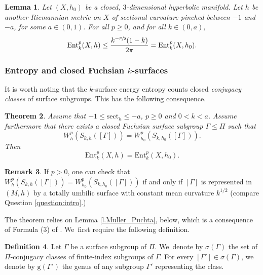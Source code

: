 \documentclass[11pt]{article}
\newcommand{\ksurface}{$k$\nobreakdash-surface\xspace}
\newcommand{\ksurfaces}{$k$\nobreakdash-surfaces\xspace}
\theoremstyle{plain}
\newtheorem{theorem}{Theorem}[section]
\newtheorem{lemma}[theorem]{Lemma}
\theoremstyle{definition}
\newtheorem{defi}[theorem]{Definition}
\newtheorem{remark}[theorem]{Remark}
\newcommand{\sect}{\mathrm{sect}}
\newcommand{\Ent}{\mathrm{Ent}}
\begin{document}
\begin{lemma}\label{l_inequality_entropy}
Let $(X,h_0)$ be a closed, $3$\nobreakdash-dimensional hyperbolic manifold. Let $h$ be another Riemannian metric on $X$ of sectional curvature pinched between $-1$ and $-a$, for some $a\in(0,1)$. For all $p\geq 0$, and for all $k\in(0,a)$,
\begin{equation*}
\Ent^{p}_{k}(X,h)\leq\frac{k^{-\sfrac{p}{2}}(1-k)}{2\pi}=\Ent^{p}_{k}(X,h_0).
\end{equation*}
\end{lemma}

\subsubsection{Entropy and closed Fuchsian \protect\ksurfaces} It is worth noting that the \ksurface energy entropy counts closed \emph{conjugacy classes} of surface subgroups. This has the following consequence.

\begin{theorem}\label{th.totally_umb_implies_big_entropy}
Assume that $-1\leq\sect_h\leq-a$, $p\geq 0$ and $0<k<a$. Assume furthermore that there exists a closed \emph{Fuchsian} surface subgroup $\Gamma\leq\Pi$ such that
\begin{equation*}
W^{p}_{h}(S_{k,h}([\Gamma]))=W^{p}_{h_0}(S_{k,h_0}([\Gamma])).
\end{equation*}
Then
\begin{equation*}
\Ent^{p}_{k}(X,h)=\Ent^{p}_{k}(X,h_0).
\end{equation*}
\end{theorem}

\begin{remark}
If $p>0$, one can check that $W^{p}_{h}(S_{k,h}([\Gamma]))=W^{p}_{h_0}(S_{k,h_0}([\Gamma]))$ if and only if $[\Gamma]$ is represented in $(M,h)$ by a totally umbilic surface with constant mean curvature $k^{1/2}$ (compare Question \ref{question:intro}.)
\end{remark}

The theorem relies on Lemma \ref{l.Muller_Puchta}, below, which is a consequence of Formula (3) of \cite{Muller_Puchta}. We~first require the following definition.

\begin{defi}\label{d.conj_classes}
Let $\Gamma$ be a surface subgroup of $\Pi$. We~denote by $\sigma(\Gamma)$ the set of $\Pi$-conjugacy classes of finite-index subgroups of $\Gamma$. For every $[\Gamma']\in\sigma(\Gamma)$, we denote by $\mathrm{g}(\Gamma')$ the genus of any subgroup $\Gamma'$ representing the class.
\end{defi}
\end{document}
